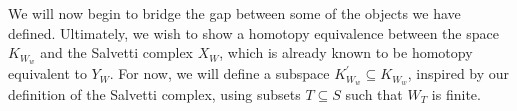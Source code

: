 \documentclass[class=article, crop=false]{standalone}
\begin{document}
We will now begin to bridge the gap between some of the objects we have defined. Ultimately, we wish to show a homotopy equivalence between the space $K_{W_w}$ and the Salvetti complex $X_W$, which is already known to be homotopy equivalent to $Y_W$. For now, we will define a subspace $K_{W_w}^\prime \subseteq K_{W_w}$, inspired by our definition of the Salvetti complex, using subsets $T\subseteq S$ such that $W_T$ is finite.
\end{document}
